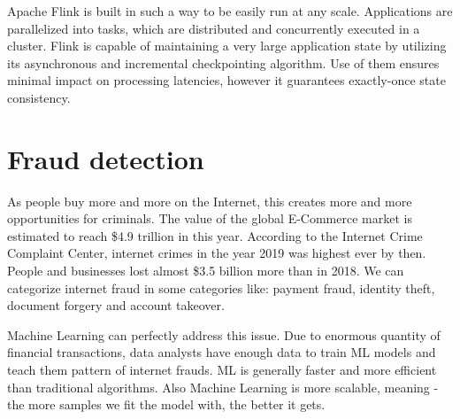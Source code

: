 Apache Flink is built in such a way to be easily run at any scale. Applications are parallelized into tasks,
which are distributed and concurrently executed in a cluster.
Flink is capable of maintaining a very large application state by utilizing its asynchronous and incremental checkpointing algorithm.
Use of them ensures minimal impact on processing latencies, however it guarantees exactly-once state consistency.\cite{flink}

\section{Fraud detection}

As people buy more and more on the Internet, this creates more and more opportunities for criminals.
The value of the global E-Commerce market is estimated to reach \$4.9 trillion in this year.
According to the Internet Crime Complaint Center, internet crimes in the year 2019 was highest ever by then.
People and businesses lost almost \$3.5 billion more than in 2018. We can categorize internet fraud
in some categories like: payment fraud, identity theft, document forgery and account takeover.

Machine Learning can perfectly address this issue. Due to enormous quantity of financial transactions,
data analysts  have enough data to train ML models and teach them pattern of internet frauds.
ML is generally faster and more efficient than traditional algorithms.
Also Machine Learning is more scalable, meaning - the more samples we fit the model with, the better it gets.\cite{frauds}
